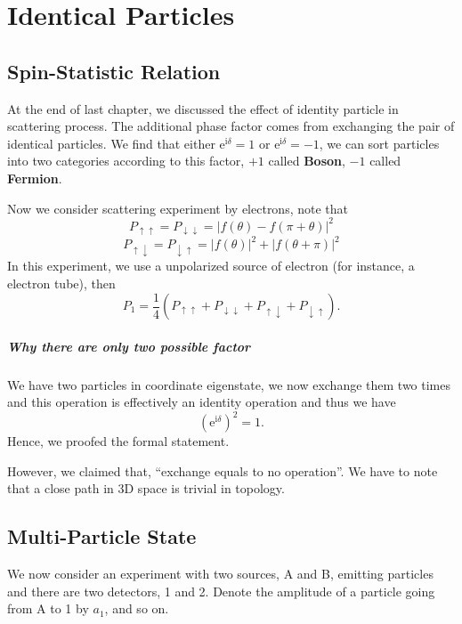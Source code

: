 \chapter[全同粒子]{Identical Particles}
\section[自旋-统计关系]{Spin-Statistic Relation}

At the end of last chapter, we discussed the effect of identity particle in scattering process. The additional phase factor comes from exchanging the pair of identical particles. We find that either $\mathrm{e}^{\mathrm{i} \delta} = 1$ or $\mathrm{e}^{\mathrm{i} \delta} = -1$, we can sort particles into two categories according to this factor, $+1$ called \textbf{Boson}, $-1$ called \textbf{Fermion}.

Now we consider scattering experiment by electrons, note that
\begin{equation}
  P_{\uparrow \uparrow} = P_{\downarrow \downarrow} = \left| f(\theta) - f(\pi + \theta) \right| ^{2}
\end{equation}
\begin{equation}
  P_{\uparrow \downarrow} = P_{\downarrow \uparrow} = |f(\theta)|^2 + |f(\theta + \pi)|^{2}
\end{equation}
In this experiment, we use a unpolarized source of electron (for instance, a electron tube), then
\begin{equation}
  P_1 = \frac{1}{4} \left( P_{\uparrow \uparrow} + P_{\downarrow \downarrow} + P_{\uparrow \downarrow} + P_{\downarrow \uparrow} \right) .
\end{equation}

\paragraph{Why there are only two possible factor}
We have two particles in coordinate eigenstate, we now exchange them two times and this operation is effectively an identity operation and thus we have
\begin{equation}
  \left( \mathrm{e}^{\mathrm{i} \delta} \right) ^{2} = 1.
\end{equation}
Hence, we proofed the formal statement.

However, we claimed that, ``exchange equals to no operation''. We have to note that a close path in 3D space is trivial in topology.

\section[多粒子态]{Multi-Particle State}
We now consider an experiment with two sources, A and B, emitting particles and there are two detectors, 1 and 2.
Denote the amplitude of a particle going from A to 1 by $a_1$, and so on.

